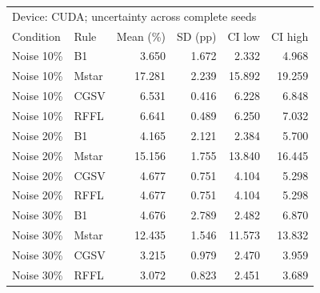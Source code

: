 \begin{tabular}{llrrrr}
\toprule
\multicolumn{6}{l}{Device: CUDA; uncertainty across complete seeds} \\
Condition & Rule & Mean (\%) & SD (pp) & CI low & CI high \\
\midrule
Noise 10\% & B1 & 3.650 & 1.672 & 2.332 & 4.968 \\
Noise 10\% & Mstar & 17.281 & 2.239 & 15.892 & 19.259 \\
Noise 10\% & CGSV & 6.531 & 0.416 & 6.228 & 6.848 \\
Noise 10\% & RFFL & 6.641 & 0.489 & 6.250 & 7.032 \\
Noise 20\% & B1 & 4.165 & 2.121 & 2.384 & 5.700 \\
Noise 20\% & Mstar & 15.156 & 1.755 & 13.840 & 16.445 \\
Noise 20\% & CGSV & 4.677 & 0.751 & 4.104 & 5.298 \\
Noise 20\% & RFFL & 4.677 & 0.751 & 4.104 & 5.298 \\
Noise 30\% & B1 & 4.676 & 2.789 & 2.482 & 6.870 \\
Noise 30\% & Mstar & 12.435 & 1.546 & 11.573 & 13.832 \\
Noise 30\% & CGSV & 3.215 & 0.979 & 2.470 & 3.959 \\
Noise 30\% & RFFL & 3.072 & 0.823 & 2.451 & 3.689 \\
\bottomrule
\end{tabular}
